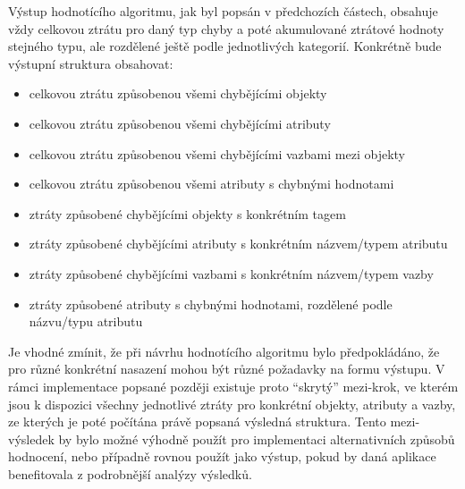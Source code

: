 Výstup hodnotícího algoritmu, jak byl popsán v předchozích částech, obsahuje vždy celkovou ztrátu pro daný typ chyby
a poté akumulované ztrátové hodnoty stejného typu, ale rozdělené ještě podle jednotlivých kategorií.
Konkrétně bude výstupní struktura obsahovat:
\begin{itemize}
	\item celkovou ztrátu způsobenou všemi chybějícími objekty
	\item celkovou ztrátu způsobenou všemi chybějícími atributy
	\item celkovou ztrátu způsobenou všemi chybějícími vazbami mezi objekty
	\item celkovou ztrátu způsobenou všemi atributy s chybnými hodnotami
	\item ztráty způsobené chybějícími objekty s konkrétním tagem
	\item ztráty způsobené chybějícími atributy s konkrétním názvem/typem atributu
	\item ztráty způsobené chybějícími vazbami s konkrétním názvem/typem vazby
	\item ztráty způsobené atributy s chybnými hodnotami, rozdělené podle názvu/typu atributu
\end{itemize}

Je vhodné zmínit, že při návrhu hodnotícího algoritmu bylo předpokládáno, že pro různé konkrétní nasazení mohou být různé požadavky na formu výstupu.
V rámci implementace popsané později existuje proto \enquote{skrytý} mezi-krok, ve kterém jsou k dispozici všechny jednotlivé ztráty pro konkrétní objekty, atributy a vazby,
ze kterých je poté počítána právě popsaná výsledná struktura.
Tento mezi-výsledek by bylo možné výhodně použít pro implementaci alternativních způsobů hodnocení, nebo případně rovnou použít jako výstup,
pokud by daná aplikace benefitovala z podrobnější analýzy výsledků.
